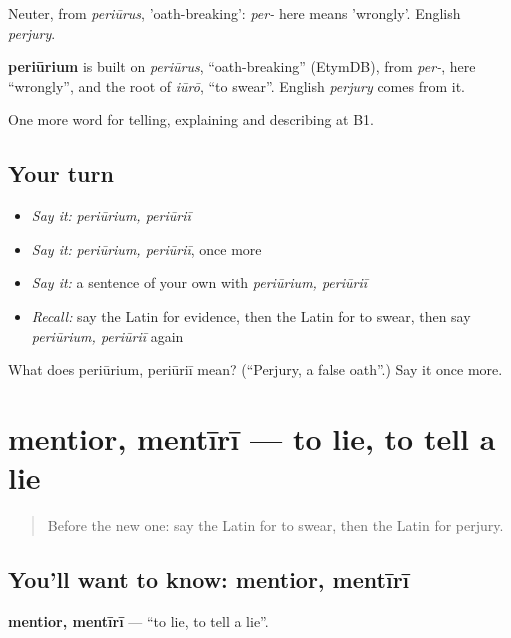 Neuter, from \emph{periūrus}, 'oath-breaking': \emph{per-} here means 'wrongly'. English \emph{perjury}.

\begin{cousinweb}
\textbf{periūrium} is built on \emph{periūrus}, \textquotedblleft{}oath-breaking\textquotedblright{} (EtymDB), from \emph{per-}, here \textquotedblleft{}wrongly\textquotedblright{}, and the root of \emph{iūrō}, \textquotedblleft{}to swear\textquotedblright{}. English \emph{perjury} comes from it.
\end{cousinweb}

\begin{grammarlens}[title={What you've built}]
One more word for telling, explaining and describing at B1.
\end{grammarlens}

\subsection*{Your turn}
\begin{itemize}
\raggedright
  \item \emph{Say it:} \emph{periūrium, periūriī}
  \item \emph{Say it:} \emph{periūrium, periūriī}, once more
  \item \emph{Say it:} a sentence of your own with \emph{periūrium, periūriī}
  \item \emph{Recall:} say the Latin for evidence, then the Latin for to swear, then say \emph{periūrium, periūriī} again
\end{itemize}

\begin{tcolorbox}[breakable,colback=teal!4,colframe=teal!35!black,title={Before you move on}]
What does periūrium, periūriī mean? (\textquotedblleft{}Perjury, a false oath\textquotedblright{}.) Say it once more.
\end{tcolorbox}
\section[mentior, mentīrī]{mentior, mentīrī — to lie, to tell a lie}

\label{lesson:LA-C310-mentior}



\begin{quote}
Before the new one: say the Latin for to swear, then the Latin for perjury.
\end{quote}

\subsection*{You'll want to know: mentior, mentīrī}
\textbf{mentior, mentīrī} — \textquotedblleft{}to lie, to tell a lie\textquotedblright{}.

